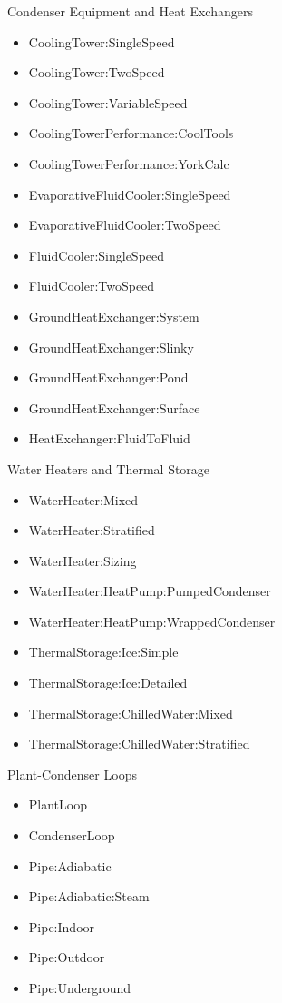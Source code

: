 Condenser Equipment and Heat Exchangers

\begin{itemize}
\tightlist
\item
  CoolingTower:SingleSpeed
\item
  CoolingTower:TwoSpeed
\item
  CoolingTower:VariableSpeed
\item
  CoolingTowerPerformance:CoolTools
\item
  CoolingTowerPerformance:YorkCalc
\item
  EvaporativeFluidCooler:SingleSpeed
\item
  EvaporativeFluidCooler:TwoSpeed
\item
  FluidCooler:SingleSpeed
\item
  FluidCooler:TwoSpeed
\item
  GroundHeatExchanger:System
\item
  GroundHeatExchanger:Slinky
\item
  GroundHeatExchanger:Pond
\item
  GroundHeatExchanger:Surface
\item
  HeatExchanger:FluidToFluid
\end{itemize}

Water Heaters and Thermal Storage

\begin{itemize}
\tightlist
\item
  WaterHeater:Mixed
\item
  WaterHeater:Stratified
\item
  WaterHeater:Sizing
\item
  WaterHeater:HeatPump:PumpedCondenser
\item
  WaterHeater:HeatPump:WrappedCondenser
\item
  ThermalStorage:Ice:Simple
\item
  ThermalStorage:Ice:Detailed
\item
  ThermalStorage:ChilledWater:Mixed
\item
  ThermalStorage:ChilledWater:Stratified
\end{itemize}

Plant-Condenser Loops

\begin{itemize}
\tightlist
\item
  PlantLoop
\item
  CondenserLoop
\item
  Pipe:Adiabatic
\item
  Pipe:Adiabatic:Steam
\item
  Pipe:Indoor
\item
  Pipe:Outdoor
\item
  Pipe:Underground
\end{itemize}
